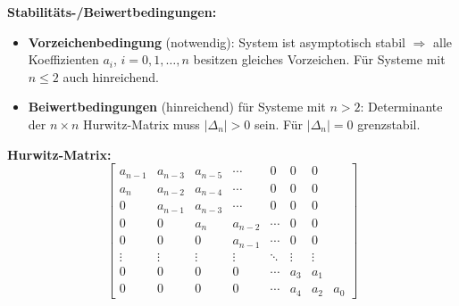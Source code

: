 \documentclass[german]{latex4ei/latex4ei_sheet}
\begin{document}
    \begin{sectionbox}
        \textbf{Stabilitäts-/Beiwertbedingungen:}
        


    \begin{itemize}
        \item \textbf{Vorzeichenbedingung} (notwendig):
        System ist asymptotisch stabil $\Rightarrow$ alle Koeffizienten $a_i$, $i = 0,1, \ldots, n$ besitzen gleiches Vorzeichen. Für Systeme mit $n \leq 2$ auch hinreichend.
        \item \textbf{Beiwertbedingungen} (hinreichend) für Systeme mit $n > 2$: Determinante der $n \times n$ Hurwitz-Matrix muss $|\Delta_n| > 0$ sein. Für $|\Delta_n| = 0$ grenzstabil.
    \end{itemize}

    \textbf{Hurwitz-Matrix:}\\
    \[
        \begin{bmatrix}
        a_{n-1} & a_{n-3} & a_{n-5} & \cdots & 0 & 0 & 0 \\
        a_n & a_{n-2} & a_{n-4} & \cdots & 0 & 0 & 0 \\
        0 & a_{n-1} & a_{n-3} & \cdots & 0 & 0 & 0 \\
        0 & 0 & a_n & a_{n-2} & \cdots & 0 & 0 \\
        0 & 0 & 0 & a_{n-1} & \cdots & 0 & 0 \\
        \vdots & \vdots & \vdots & \vdots & \ddots & \vdots & \vdots \\
        0 & 0 & 0 & 0 & \cdots & a_3 & a_1 \\
        0 & 0 & 0 & 0 & \cdots & a_4 & a_2 & a_0
        \end{bmatrix}
    \]

    \end{sectionbox}
\end{document}
